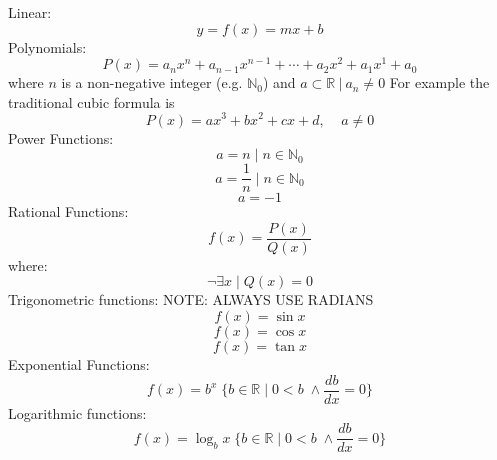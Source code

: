 Linear:
\[
 y = f(x) = mx + b
\]
Polynomials:
\[
  P(x) = a_nx^n+a_{n-1}x^{n-1}+\cdots+a_2x^2+a_1x^1+a_0
\]
where \(n\) is a non-negative integer (e.g. \(\mathbb{N}_0\)) and \(a \subset \mathbb{R} \: | \: a_n \neq 0\)
For example the traditional cubic formula is 
\[
 P(x) = ax^3+bx^2+cx +d, \;\;\;\; a \neq 0
\]
Power Functions:
\begin{equation} \label{(1)}
a = n \; | \; n \in \mathbb{N}_0 
\end{equation}
\begin{equation} \label{(2)}
a = \frac{1}{n} \; | \; n \in \mathbb{N}_0 
\end{equation}
\begin{equation} \label{(3)}
a = -1   
\end{equation}
Rational Functions:
\[
f(x)=\frac{P(x)}{Q(x)}
\]
where:
\[
\neg \exists x \;|\;Q(x) =0
\]
Trigonometric functions:
NOTE: ALWAYS USE RADIANS
\begin{equation} \label{sine}
    f(x)=\sin x
\end{equation}
\begin{equation} \label{cosine}
    f(x)=\cos x
\end{equation}
\begin{equation} \label{tan}
    f(x)=\tan x
\end{equation}
Exponential Functions:
\[
f(x) = b^x \; \{b \in \mathbb{R}\;|\; 0 < b \;\wedge \frac{db}{dx}=0\}
\]
Logarithmic functions:
\[
f(x) = \log_b x \; \{b \in \mathbb{R}\;|\; 0 < b \;\wedge \frac{db}{dx}=0\}
\]
